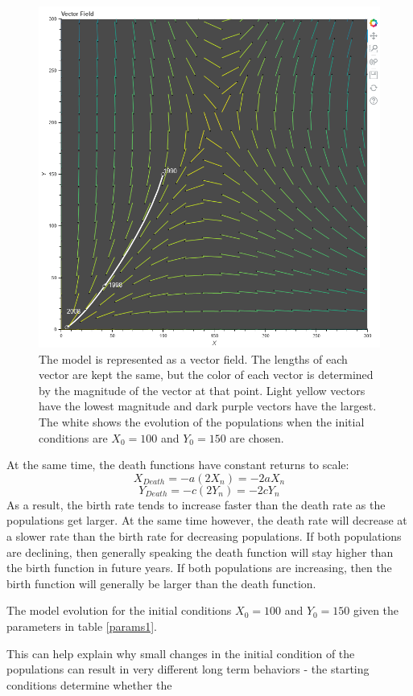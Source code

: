 \documentclass[12pt,a4paper,titlepage]{report}
\begin{document}
		\begin{figure}[htbp]
			\centerline{\includegraphics[scale=.5]{charts/problem3_chart.png}}
			\caption{The model is represented as a vector field. The lengths of each vector are kept the same, but the color of each vector is determined by the magnitude of the vector at that point. Light yellow vectors have the lowest magnitude and dark purple vectors have the largest. The white shows the evolution of the populations when the initial conditions are \(X_{0} = 100\) and \(Y_{0} = 150\) are chosen.}
			\label{fig:p3}
		\end{figure}
		At the same time, the death functions have constant returns to scale:
		\[X_{Death} = -a (2X_{n}) = -2aX_{n}\]
		\[Y_{Death} = -c (2Y_{n}) = -2cY_{n}\]
		As a result, the birth rate tends to increase faster than the death rate as the populations get larger. At the same time however, the death rate will decrease at a slower rate than the birth rate for decreasing populations. If both populations are declining, then generally speaking the death function will stay higher than the birth function in future years. If both populations are increasing, then the birth function will generally be larger than the death function. 
		\begin{table} 
			\centering
			
			\caption{The model evolution for the initial conditions \(X_{0} = 100\) and \(Y_{0} = 150\) given the parameters in table \ref{params1}.}
			\label{tab:p3}
		\end{table}
		This can help explain why small changes in the initial condition of the populations can result in very different long term behaviors - the starting conditions determine whether the 
		
\end{document}
